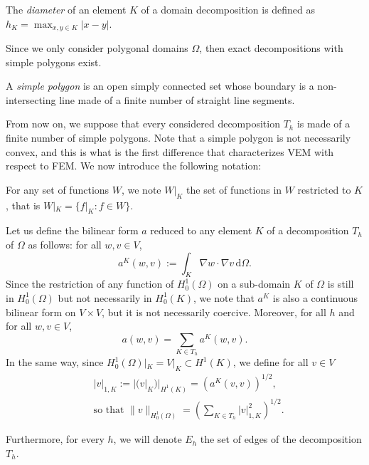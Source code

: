 \begin{definition}[Diameter]
The \textit{diameter} of an element $K$ of a domain decomposition is defined as $h_K = \max_{x,y\in K}|x-y|$. 
\end{definition}

\noindent Since we only consider polygonal domains $\Omega$, then exact decompositions with simple polygons exist. 

\begin{definition}
A \textit{simple polygon} is an open simply connected set whose boundary is a non-intersecting line made of a finite number of straight line segments. 
\end{definition}

\noindent From now on, we suppose that every considered decomposition $T_h$ is made of a finite number of simple polygons. Note that a simple polygon is not necessarily convex, and this is what is the first difference that characterizes VEM with respect to FEM. We now introduce the following notation: 
\begin{notation}
For any set of functions $W$, we note $W|_K$ the set of functions in $W$ restricted to $K$, that is $W|_K = \{f|_K : f\in W\}$. 
\end{notation}

\noindent Let us define the bilinear form $a$ reduced to any element $K$ of a decomposition $T_h$ of $\Omega$ as follows: for all $w,v\in V$,
$$ a^K(w,v) := \int_K \nabla w \cdot \nabla v \, \mathrm{d}\Omega. $$
Since the restriction of any function of $H_0^1(\Omega)$ on a sub-domain $K$ of $\Omega$ is still in $H_0^1(\Omega)$ but not necessarily in $H_0^1(K)$, we note that $a^K$ is also a continuous bilinear form on $V\times V$, but it is not necessarily coercive. Moreover, for all $h$ and for all $w,v\in V$, \begin{equation}\label{aKvsa}
a(w,v) = \sum_{K\in T_h} a^K(w,v).
\end{equation}
In the same way, since $H_0^1(\Omega)|_K = V|_K \subset H^1(K)$, we define for all $v\in V$
\begin{align}
&|v|_{1, K} := |(v|_K)|_{H^1(K)} = \left( a^K\left( v,v \right)\right)^{1/2}, \label{def1Knorm}\\
&\text{so that } \|v\|_{H_0^1(\Omega)} = \left(\sum_{K\in T_h} |v|_{1,K}^2\right)^{1/2}.\label{H01normsplit}
\end{align} 

\noindent Furthermore, for every $h$, we will denote $E_h$ the set of edges of the decomposition $T_h$. 


